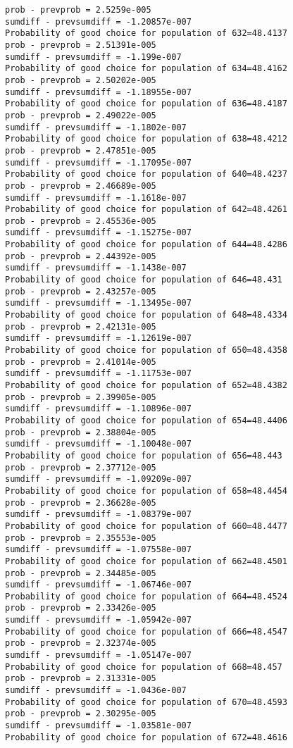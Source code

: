 \documentclass[11pt,onecolumn]{article}
\begin{document}
\begin{verbatim}
prob - prevprob = 2.5259e-005
sumdiff - prevsumdiff = -1.20857e-007
Probability of good choice for population of 632=48.4137
prob - prevprob = 2.51391e-005
sumdiff - prevsumdiff = -1.199e-007
Probability of good choice for population of 634=48.4162
prob - prevprob = 2.50202e-005
sumdiff - prevsumdiff = -1.18955e-007
Probability of good choice for population of 636=48.4187
prob - prevprob = 2.49022e-005
sumdiff - prevsumdiff = -1.1802e-007
Probability of good choice for population of 638=48.4212
prob - prevprob = 2.47851e-005
sumdiff - prevsumdiff = -1.17095e-007
Probability of good choice for population of 640=48.4237
prob - prevprob = 2.46689e-005
sumdiff - prevsumdiff = -1.1618e-007
Probability of good choice for population of 642=48.4261
prob - prevprob = 2.45536e-005
sumdiff - prevsumdiff = -1.15275e-007
Probability of good choice for population of 644=48.4286
prob - prevprob = 2.44392e-005
sumdiff - prevsumdiff = -1.1438e-007
Probability of good choice for population of 646=48.431
prob - prevprob = 2.43257e-005
sumdiff - prevsumdiff = -1.13495e-007
Probability of good choice for population of 648=48.4334
prob - prevprob = 2.42131e-005
sumdiff - prevsumdiff = -1.12619e-007
Probability of good choice for population of 650=48.4358
prob - prevprob = 2.41014e-005
sumdiff - prevsumdiff = -1.11753e-007
Probability of good choice for population of 652=48.4382
prob - prevprob = 2.39905e-005
sumdiff - prevsumdiff = -1.10896e-007
Probability of good choice for population of 654=48.4406
prob - prevprob = 2.38804e-005
sumdiff - prevsumdiff = -1.10048e-007
Probability of good choice for population of 656=48.443
prob - prevprob = 2.37712e-005
sumdiff - prevsumdiff = -1.09209e-007
Probability of good choice for population of 658=48.4454
prob - prevprob = 2.36628e-005
sumdiff - prevsumdiff = -1.08379e-007
Probability of good choice for population of 660=48.4477
prob - prevprob = 2.35553e-005
sumdiff - prevsumdiff = -1.07558e-007
Probability of good choice for population of 662=48.4501
prob - prevprob = 2.34485e-005
sumdiff - prevsumdiff = -1.06746e-007
Probability of good choice for population of 664=48.4524
prob - prevprob = 2.33426e-005
sumdiff - prevsumdiff = -1.05942e-007
Probability of good choice for population of 666=48.4547
prob - prevprob = 2.32374e-005
sumdiff - prevsumdiff = -1.05147e-007
Probability of good choice for population of 668=48.457
prob - prevprob = 2.31331e-005
sumdiff - prevsumdiff = -1.0436e-007
Probability of good choice for population of 670=48.4593
prob - prevprob = 2.30295e-005
sumdiff - prevsumdiff = -1.03581e-007
Probability of good choice for population of 672=48.4616

\end{verbatim}
\end{document}
